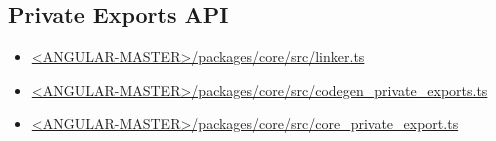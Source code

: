 \subsection{Private Exports API}



\begin{itemize}
  \item \href{https://github.com/angular/angular/blob/master/packages/core/src/linker.ts}
        {<ANGULAR-MASTER>/packages/core/src/linker.ts}
\end{itemize}





\begin{itemize}
  \item \href{https://github.com/angular/angular/blob/master/packages/core/src/codegen_private_exports.ts}
        {<ANGULAR-MASTER>/packages/core/src/codegen\_private\_exports.ts}
  \item \href{https://github.com/angular/angular/blob/master/packages/core/src/core_private_export.ts}
        {<ANGULAR-MASTER>/packages/core/src/core\_private\_export.ts}
\end{itemize}






